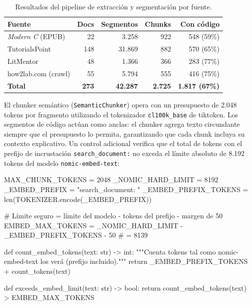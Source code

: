 \documentclass[12pt]{article}
\begin{document}
\begin{table}[H]
    \centering
    \begin{tabular}{lrrrr}
        \toprule
        \textbf{Fuente} & \textbf{Docs} & \textbf{Segmentos} & \textbf{Chunks} & \textbf{Con código} \\
        \midrule
        \textit{Modern C} (EPUB)    &  22 &  3.258 &  922 & 548 (59\%) \\
        TutorialsPoint              & 148 & 31.869 &  882 & 570 (65\%) \\
        LitMentor                   &  48 &  1.366 &  366 & 283 (77\%) \\
        how2lab.com (crawl)         &  55 &  5.794 &  555 & 416 (75\%) \\
        \midrule
        \textbf{Total}              & \textbf{273} & \textbf{42.287} & \textbf{2.725} & \textbf{1.817 (67\%)} \\
        \bottomrule
    \end{tabular}
    \caption{Resultados del pipeline de extracción y segmentación por fuente.}
\end{table}

El chunker semántico (\texttt{SemanticChunker}) opera con un presupuesto de
2.048 tokens por fragmento utilizando el tokenizador \texttt{cl100k\_base} de
tiktoken. Los segmentos de código actúan como anclas: el chunker agrega texto
circundante siempre que el presupuesto lo permita, garantizando que cada chunk
incluya su contexto explicativo. Un control adicional verifica que el total
de tokens con el prefijo de incrustación \texttt{search\_document:} no exceda
el límite absoluto de 8.192 tokens del modelo \texttt{nomic-embed-text}:

\begin{python}
MAX_CHUNK_TOKENS = 2048
_NOMIC_HARD_LIMIT = 8192
_EMBED_PREFIX = "search_document: "
_EMBED_PREFIX_TOKENS = len(TOKENIZER.encode(_EMBED_PREFIX))

# Límite seguro = límite del modelo - tokens del prefijo - margen de 50
EMBED_MAX_TOKENS = _NOMIC_HARD_LIMIT - _EMBED_PREFIX_TOKENS - 50  # = 8139

def count_embed_tokens(text: str) -> int:
    """Cuenta tokens tal como nomic-embed-text los verá (prefijo incluido)."""
    return _EMBED_PREFIX_TOKENS + count_tokens(text)

def exceeds_embed_limit(text: str) -> bool:
    return count_embed_tokens(text) > EMBED_MAX_TOKENS
\end{python}
\end{document}
